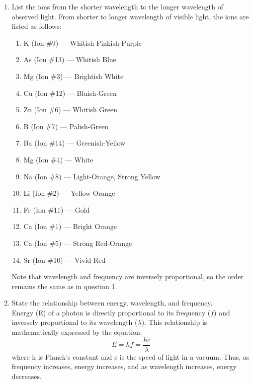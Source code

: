 \documentclass[11pt]{article}
\begin{document}
\begin{enumerate}
\begin{enumerate}
        \item Ba (Ion \#14) --- Greenish-Yellow
        \item Mg (Ion \#4) --- White
        \item Na (Ion \#8) --- Light-Orange, Strong Yellow
        \item Li (Ion \#2) --- Yellow Orange
        \item Fe (Ion \#11) --- Gold
        \item Ca (Ion \#1) --- Bright Orange
        \item Ca (Ion \#5) --- Strong Red-Orange
        \item Sr (Ion \#10) --- Vivid Red
    \end{enumerate}  
Note that frequency and energy are directly proportional, so the order remains the same as in question 1.
    \item List the ions from the shorter wavelength to the longer wavelength of observed light.
From shorter to longer wavelength of visible light, the ions are listed as follows:
    \begin{enumerate}
        \item K (Ion \#9) --- Whitish-Pinkish-Purple
        \item As (Ion \#13) --- Whitish Blue
        \item Mg (Ion \#3) --- Brightish White
        \item Cu (Ion \#12) --- Bluish-Green
        \item Zn (Ion \#6) --- Whitish Green
        \item B (Ion \#7) --- Palish-Green
        \item Ba (Ion \#14) --- Greenish-Yellow
        \item Mg (Ion \#4) --- White
        \item Na (Ion \#8) --- Light-Orange, Strong Yellow
        \item Li (Ion \#2) --- Yellow Orange
        \item Fe (Ion \#11) --- Gold
        \item Ca (Ion \#1) --- Bright Orange
        \item Ca (Ion \#5) --- Strong Red-Orange
        \item Sr (Ion \#10) --- Vivid Red
    \end{enumerate}
Note that wavelength and frequency are inversely proportional, so the order remains the same as in question 1.       
    \item State the relationship between energy, wavelength, and frequency. \\
    Energy (E) of a photon is directly proportional to its frequency ($f$) and inversely proportional to its wavelength ($\lambda$). This relationship is mathematically expressed by the equation:
    \[E = hf = \frac{hc}{\lambda}\]
    where h is Planck's constant and c is the speed of light in a vacuum. Thus, as frequency increases, energy increases, and as wavelength increases, energy decreases.
\end{enumerate}  

    
    
\end{document}

